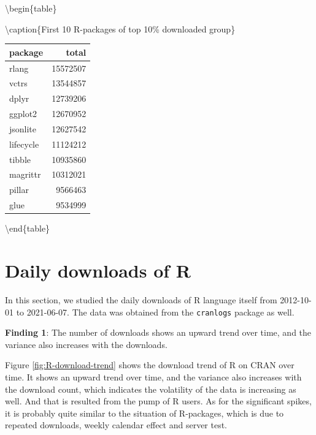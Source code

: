 \documentclass[
]{book}
\newenvironment{discovery}[1]{%
  \begin{tcolorbox}[colback=blue!30,colframe=blue!80!black]#1}{\end{tcolorbox}}
\begin{document}
\textbackslash begin\{table\}

\textbackslash caption\{\label{tab:top10}First 10 R-packages of top 10\% downloaded group\}
\centering

\begin{tabular}[t]{l|r}
\hline
package & total\\
\hline
rlang & 15572507\\
\hline
vctrs & 13544857\\
\hline
dplyr & 12739206\\
\hline
ggplot2 & 12670952\\
\hline
jsonlite & 12627542\\
\hline
lifecycle & 11124212\\
\hline
tibble & 10935860\\
\hline
magrittr & 10312021\\
\hline
pillar & 9566463\\
\hline
glue & 9534999\\
\hline
\end{tabular}

\textbackslash end\{table\}

\hypertarget{daily-downloads-of-r}{%
\section{Daily downloads of R}\label{daily-downloads-of-r}}

In this section, we studied the daily downloads of R language itself from 2012-10-01 to 2021-06-07. The data was obtained from the \texttt{cranlogs} package \autocite{cranlogs} as well.

\begin{discovery}
\textbf{Finding 1}: The number of downloads shows an upward trend over
time, and the variance also increases with the downloads.
\end{discovery}

Figure \ref{fig:R-download-trend} shows the download trend of R on CRAN over time. It shows an upward trend over time, and the variance also increases with the download count, which indicates the volatility of the data is increasing as well. And that is resulted from the pump of R users. As for the significant spikes, it is probably quite similar to the situation of R-packages, which is due to repeated downloads, weekly calendar effect and server test.
\end{document}
